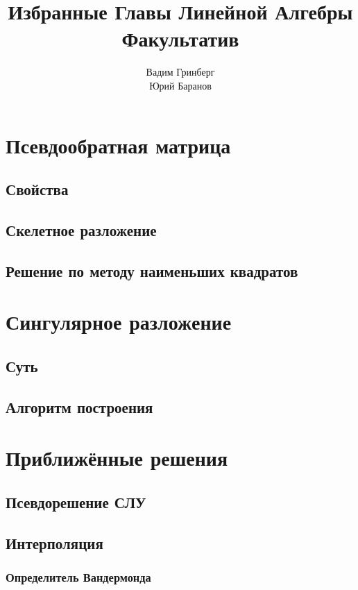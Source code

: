 \documentclass[a4paper,12pt]{article}
\title{\Huge{Избранные Главы Линейной Алгебры \\ Факультатив}}
\author{Вадим Гринберг \\ Юрий Баранов}
\date{}
\begin{document}
\maketitle
\tableofcontents


\newpage
\section{Псевдообратная матрица}

\subsection{Свойства}

\subsection{Скелетное разложение}

\subsection{Решение по методу наименьших квадратов}

\newpage
\section{Сингулярное разложение}

\subsection{Суть}

\subsection{Алгоритм построения}


\newpage
\section{Приближённые решения}

\subsection{Псевдорешение СЛУ}

\subsection{Интерполяция}

\subsubsection{Определитель Вандермонда}
\end{document}
